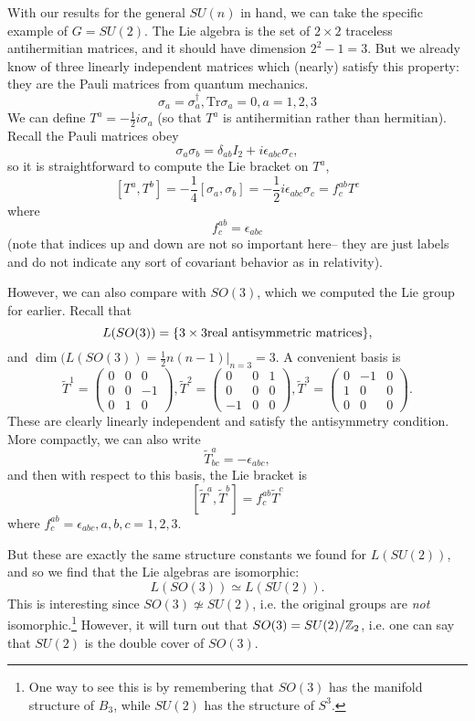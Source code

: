 \begin{exm}
With our results for the general $SU(n)$ in hand, we can take the specific example of $G=SU(2)$. The Lie algebra is the set of $2\times 2$ traceless antihermitian matrices, and it should have dimension $2^2-1=3$. But we already know of three linearly independent matrices which (nearly) satisfy this property: they are the Pauli matrices from quantum mechanics.
$$\sigma_a=\sigma_a^\dagger, \text{Tr}\sigma_a= 0, a=1,2,3$$
We can define $T^a=-\frac{1}{2} i \sigma_a$ (so that $T^a$ is antihermitian rather than hermitian). Recall the Pauli matrices obey
$$\sigma_a\sigma_b = \delta_{ab}I_2 +i \epsilon_{abc}\sigma_c,$$
so it is straightforward to compute the Lie bracket on $T^a$,
$$[T^a,T^b]=-\frac{1}{4}[\sigma_a, \sigma_b] = -\frac{1}{2}i \epsilon_{abc} \sigma_c = f^{ab}_c T^c$$
where
$$f^{ab}_c=\epsilon_{abc}$$
(note that indices up and down are not so important here-- they are just labels and do not indicate any sort of covariant behavior as in relativity).

However, we can also compare with $SO(3)$, which we computed the Lie group for earlier. Recall that
$$L(SO(3))=\{3\times 3\text{real antisymmetric matrices}\},$$
and $\dim(L(SO(3))=\frac{1}{2}n(n-1)|_{n=3}=3$. A convenient basis is
$$\tilde T^1=\begin{pmatrix}
0&0&0\\
0&0&-1\\
0&1&0
\end{pmatrix},
\tilde T^2 =\begin{pmatrix}
0&0&1\\
0&0&0\\
-1&0&0
\end{pmatrix},
\tilde T^3 = \begin{pmatrix}
0&-1&0\\
1&0&0\\
0&0&0
\end{pmatrix}.
$$
These are clearly linearly independent and satisfy the antisymmetry condition. More compactly, we can also write $$\tilde T^a_{bc}=-\epsilon_{abc},$$ and then with respect to this basis, the Lie bracket is
$$[\tilde T^a, \tilde T^b]=f^{ab}_c \tilde T^c$$
where $f^{ab}_c= \epsilon_{abc}, a,b,c=1,2,3$.

But these are exactly the same structure constants we found for $L(SU(2))$, and so we find that the Lie algebras are isomorphic:
$$L(SO(3)) \simeq L(SU(2)).$$
This is interesting since $SO(3)\not \simeq SU(2)$, i.e. the original groups are \emph{not} isomorphic.\footnote{One way to see this is by remembering that $SO(3)$ has the manifold structure of $B_3$, while $SU(2)$ has the structure of $S^3$.} However, it will turn out that $SO(3)=SU(2)/\mathbb{Z}_2$, i.e. one can say that $SU(2)$ is the double cover of $SO(3)$.
\end{exm}

